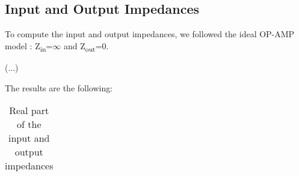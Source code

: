 \subsection{Input and Output Impedances}

To compute the input and output impedances, we followed the ideal OP-AMP model : Z\textsubscript{in}=$\infty$ and Z\textsubscript{out}=0.

(...)

The results are the following:

\begin{table}[!htb]
\centering
  \begin{tabular}{|c|c|}
    \hline    
    
 \end{tabular}
 \caption{Real part of the input and output impedances}\label{tab:theo:impedances}
\end{table}



